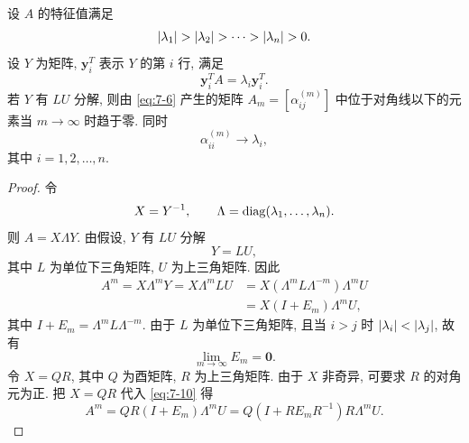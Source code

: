 \begin{theorem}
\label{thm:7-4}
设 $A$ 的特征值满足
\[
  \abs{\lambda_1}>\abs{\lambda_2}>\cdots>\abs{\lambda_n}>0.
\]
设 $Y$ 为矩阵, $\mathbf{y}_i^T$ 表示 $Y$ 的第 $i$ 行, 满足
\[
  \mathbf{y}_i^TA=\lambda_i\mathbf{y}_i^T.
\]
若 $Y$ 有 $LU$ 分解, 则由 \eqref{eq:7-6} 产生的矩阵 $A_m=[\alpha_{ij}^{(m)}]$ 中位于对角线以下的元素当 $m\rightarrow\infty$ 时趋于零. 同时
\[
  \alpha_{ii}^{(m)}\rightarrow\lambda_i,
\]
其中 $i=1,2,\ldots,n$.
\end{theorem}

\begin{proof}
令
\[
  X=Y^{-1},\qquad \Lambda=\operatorname{diag}(\lambda_1,\ldots,\lambda_n).
\]
则 $A=X\Lambda Y$. 由假设, $Y$ 有 $LU$ 分解
\[
  Y=LU,
\]
其中 $L$ 为单位下三角矩阵, $U$ 为上三角矩阵. 因此
\begin{equation}
  \begin{aligned}
    A^m=X\Lambda^mY=X\Lambda^mLU
    &=X(\Lambda^mL\Lambda^{-m})\Lambda^mU\\
    &=X(I+E_m)\Lambda^mU,
  \end{aligned}
  \label{eq:7-10}
\end{equation}
其中 $I+E_m=\Lambda^mL\Lambda^{-m}$. 由于 $L$ 为单位下三角矩阵, 且当 $i>j$ 时 $\left|\lambda_i\right|<\left|\lambda_j\right|$, 故有
\begin{equation}
  \lim_{m\rightarrow\infty}E_m=\mathbf{0}.
  \label{eq:7-11}
\end{equation}
令 $X=QR$, 其中 $Q$ 为酉矩阵, $R$ 为上三角矩阵. 由于 $X$ 非奇异, 可要求 $R$ 的对角元为正. 把 $X=QR$ 代入 \eqref{eq:7-10} 得
\begin{equation}
  A^m=QR(I+E_m)\Lambda^mU
  =Q(I+RE_mR^{-1})R\Lambda^mU.
  \label{eq:7-12}
\end{equation}


\end{proof}
